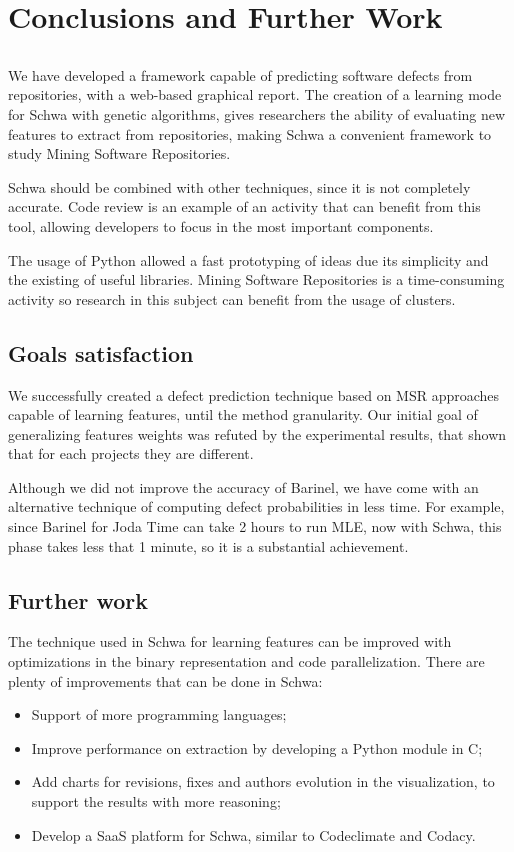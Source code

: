 \chapter{Conclusions and Further Work} \label{chap:concl}
\section*{}
We have developed a framework capable of predicting software defects from repositories, with a web-based graphical report. The creation of a learning mode for Schwa with genetic algorithms, gives researchers the ability of evaluating new features to extract from repositories, making Schwa a convenient framework to study Mining Software Repositories.

Schwa should be combined with other techniques, since it is not completely accurate. Code review is an example of an activity that can benefit from this tool, allowing developers to focus in the most important components.

The usage of Python allowed a fast prototyping of ideas due its simplicity and the existing of useful libraries. Mining Software Repositories is a time-consuming activity so research in this subject can benefit from the usage of clusters.

\section{Goals satisfaction}

We successfully created a defect prediction technique based on MSR approaches capable of learning features, until the method granularity. Our initial goal of generalizing features weights was refuted by the experimental results, that shown that for each projects they are different.

Although we did not improve the accuracy of Barinel, we have come with an alternative technique of computing defect probabilities in less time. For example, since Barinel for Joda Time can take 2 hours to run MLE, now with Schwa, this phase takes less that 1 minute, so it is a substantial achievement.


\section{Further work}
The technique used in Schwa for learning features can be improved with optimizations in the binary representation and code parallelization. There are plenty of improvements that can be done in Schwa:
\begin{itemize}
\item Support of more programming languages;
\item Improve performance on extraction by developing a Python module in C;
\item Add charts for revisions, fixes and authors evolution in the visualization, to support the results with more reasoning;
\item Develop a SaaS platform for Schwa, similar to Codeclimate and Codacy.
\end{itemize}

